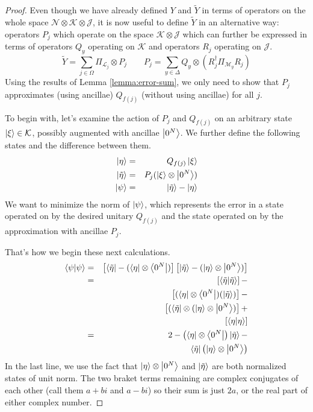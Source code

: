 \begin{proof}
Even though we have already defined $Y$ and $\tilde{Y}$ in terms of
operators on the whole space
$\mathcal{N} \otimes \mathcal{K} \otimes \mathcal{J}$, it is now useful to
define $\tilde{Y}$ in an alternative way: operators $P_j$ which operate on the
space $\mathcal{K} \otimes \mathcal{J}$ which can further be expressed
in terms of operators $Q_y$ operating on $\mathcal{K}$ and operators
$R_j$ operating on $\mathcal{J}$.
%
\begin{equation}
\tilde{Y} = \sum_{j \in \Omega} \Pi_{\mathcal{L}_j} \otimes P_j \qquad
P_j = \sum_{y \in \Delta} Q_y \otimes (R_j^{\dagger}\Pi_{\mathcal{M}_y}R_j)
\end{equation}
%
Using the results of Lemma \ref{lemma:error-sum}, we only need to show that
$P_j$ approximates (using ancillae) $Q_{f(j)}$ (without using ancillae) for
all $j$.

To begin with, let's examine the action of $P_j$ and $Q_{f(j)}$ on
an arbitrary state $\left\vert{\xi}\right\rangle \in \mathcal{K}$, possibly augmented with
ancillae $\left\vert{0^N}\right\rangle$.
We further define the following states and the difference between them.
%
\begin{eqnarray}
\left\vert{\eta}\right\rangle         & = & Q_{f(j)} \left\vert{\xi}\right\rangle \\
\left\vert{\tilde{\eta}}\right\rangle & = & P_j(\left\vert{\xi}\right\rangle \otimes \left\vert{0^N}\right\rangle) \\
\left\vert{\psi}\right\rangle         & = & \left\vert{\tilde{\eta}}\right\rangle - \left\vert{\eta}\right\rangle
\end{eqnarray}
%
We want to minimize the norm of $\left\vert{\psi}\right\rangle$, which represents the error
in a state operated on by the desired unitary $Q_{f(j)}$ and the state
operated on by the approximation with ancillae $P_j$.

That's how we begin these next calculations.
%
\begin{eqnarray}
\langle \psi|\psi \rangle & = & \left[ \left\langle{\tilde{\eta}}\right\vert - (\left\langle{\eta}\right\vert \otimes \left\langle{0^N}\right\vert) \right]
                    \left[ \left\vert{\tilde{\eta}}\right\rangle - (\left\vert{\eta}\right\rangle \otimes \left\vert{0^N}\right\rangle) \right] \\
              & = & \left[ \langle \tilde{\eta}|\tilde{\eta} \rangle \right ] - \\
              &   & \left[ (\left\langle{\eta}\right\vert \otimes \left\langle{0^N}\right\vert)(\left\vert{\tilde{\eta}}\right\rangle) \right] - \\
              &   & \left[ (\left\langle{\tilde{\eta}}\right\vert \otimes (\left\vert{\eta}\right\rangle \otimes \left\vert{0^N}\right\rangle) \right] + \\
              &   & \left[ \langle \eta|\eta \rangle \right] \\
              & = & 2 - \left(\left\langle{\eta}\right\vert \otimes \left\langle{0^N}\right\vert \right) \left\vert{\tilde{\eta}}\right\rangle - \\
              &   & \left\langle{\tilde{\eta}}\right\vert \left( \left\vert{\eta}\right\rangle \otimes \left\vert{0^N}\right\rangle \right)
\end{eqnarray}
%
In the last line, we use the fact that $\left\vert{\eta}\right\rangle \otimes \left\vert{0^N}\right\rangle$ and
$\left\vert{\tilde{\eta}}\right\rangle$ are both normalized states of unit norm. The two braket
terms remaining are complex conjugates of each other (call them $a+bi$ and
$a-bi$) so their sum is just $2a$, or the real part of either complex number.


\end{proof}
